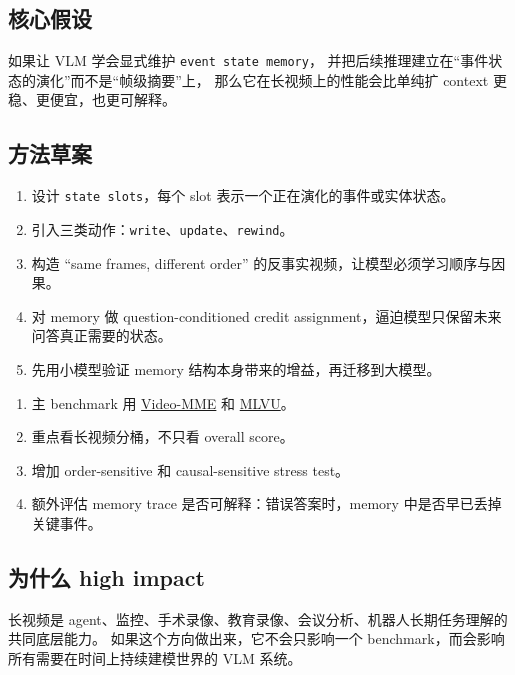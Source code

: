 \documentclass[12pt,a4paper]{article}
\begin{document}
\subsection{核心假设}

如果让 VLM 学会显式维护 \texttt{event state memory}，
并把后续推理建立在``事件状态的演化''而不是``帧级摘要''上，
那么它在长视频上的性能会比单纯扩 context 更稳、更便宜，也更可解释。

\subsection{方法草案}

\begin{enumerate}[leftmargin=2em]
  \item 设计 \texttt{state slots}，每个 slot 表示一个正在演化的事件或实体状态。
  \item 引入三类动作：\texttt{write}、\texttt{update}、\texttt{rewind}。
  \item 构造 ``same frames, different order'' 的反事实视频，让模型必须学习顺序与因果。
  \item 对 memory 做 question-conditioned credit assignment，逼迫模型只保留未来问答真正需要的状态。
  \item 先用小模型验证 memory 结构本身带来的增益，再迁移到大模型。
\end{enumerate}

\begin{expbox}
\begin{enumerate}[leftmargin=2em]
  \item 主 benchmark 用 \href{https://arxiv.org/abs/2405.21075}{Video-MME} 和 \href{https://arxiv.org/abs/2406.04264}{MLVU}。
  \item 重点看长视频分桶，不只看 overall score。
  \item 增加 order-sensitive 和 causal-sensitive stress test。
  \item 额外评估 memory trace 是否可解释：错误答案时，memory 中是否早已丢掉关键事件。
\end{enumerate}
\end{expbox}

\subsection{为什么 high impact}

长视频是 agent、监控、手术录像、教育录像、会议分析、机器人长期任务理解的共同底层能力。
如果这个方向做出来，它不会只影响一个 benchmark，而会影响所有需要在时间上持续建模世界的 VLM 系统。
\end{document}
